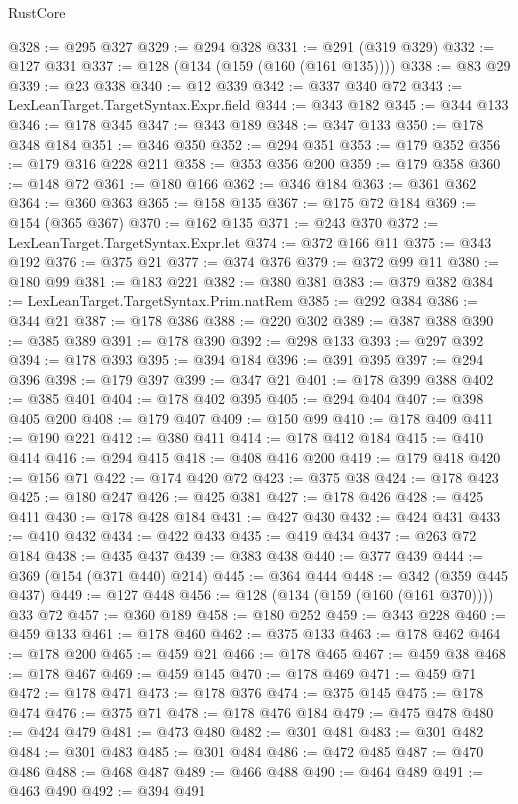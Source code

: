 \begin{lexlean}{RustCore}
\begin{coremodule}
@328 := @295 @327
@329 := @294 @328
@331 := @291 (@319 @329)
@332 := @127 @331
@337 := @128 (@134 (@159 (@160 (@161 @135))))
@338 := @83 @29
@339 := @23 @338
@340 := @12 @339
@342 := @337 @340 @72
@343 := LexLeanTarget.TargetSyntax.Expr.field
@344 := @343 @182
@345 := @344 @133
@346 := @178 @345
@347 := @343 @189
@348 := @347 @133
@350 := @178 @348 @184
@351 := @346 @350
@352 := @294 @351
@353 := @179 @352
@356 := @179 @316 @228 @211
@358 := @353 @356 @200
@359 := @179 @358
@360 := @148 @72
@361 := @180 @166
@362 := @346 @184
@363 := @361 @362
@364 := @360 @363
@365 := @158 @135
@367 := @175 @72 @184
@369 := @154 (@365 @367)
@370 := @162 @135
@371 := @243 @370
@372 := LexLeanTarget.TargetSyntax.Expr.let
@374 := @372 @166 @11
@375 := @343 @192
@376 := @375 @21
@377 := @374 @376
@379 := @372 @99 @11
@380 := @180 @99
@381 := @183 @221
@382 := @380 @381
@383 := @379 @382
@384 := LexLeanTarget.TargetSyntax.Prim.natRem
@385 := @292 @384
@386 := @344 @21
@387 := @178 @386
@388 := @220 @302
@389 := @387 @388
@390 := @385 @389
@391 := @178 @390
@392 := @298 @133
@393 := @297 @392
@394 := @178 @393
@395 := @394 @184
@396 := @391 @395
@397 := @294 @396
@398 := @179 @397
@399 := @347 @21
@401 := @178 @399 @388
@402 := @385 @401
@404 := @178 @402 @395
@405 := @294 @404
@407 := @398 @405 @200
@408 := @179 @407
@409 := @150 @99
@410 := @178 @409
@411 := @190 @221
@412 := @380 @411
@414 := @178 @412 @184
@415 := @410 @414
@416 := @294 @415
@418 := @408 @416 @200
@419 := @179 @418
@420 := @156 @71
@422 := @174 @420 @72
@423 := @375 @38
@424 := @178 @423
@425 := @180 @247
@426 := @425 @381
@427 := @178 @426
@428 := @425 @411
@430 := @178 @428 @184
@431 := @427 @430
@432 := @424 @431
@433 := @410 @432
@434 := @422 @433
@435 := @419 @434
@437 := @263 @72 @184
@438 := @435 @437
@439 := @383 @438
@440 := @377 @439
@444 := @369 (@154 (@371 @440) @214)
@445 := @364 @444
@448 := @342 (@359 @445 @437)
@449 := @127 @448
@456 := @128 (@134 (@159 (@160 (@161 @370)))) @33 @72
@457 := @360 @189
@458 := @180 @252
@459 := @343 @228
@460 := @459 @133
@461 := @178 @460
@462 := @375 @133
@463 := @178 @462
@464 := @178 @200
@465 := @459 @21
@466 := @178 @465
@467 := @459 @38
@468 := @178 @467
@469 := @459 @145
@470 := @178 @469
@471 := @459 @71
@472 := @178 @471
@473 := @178 @376
@474 := @375 @145
@475 := @178 @474
@476 := @375 @71
@478 := @178 @476 @184
@479 := @475 @478
@480 := @424 @479
@481 := @473 @480
@482 := @301 @481
@483 := @301 @482
@484 := @301 @483
@485 := @301 @484
@486 := @472 @485
@487 := @470 @486
@488 := @468 @487
@489 := @466 @488
@490 := @464 @489
@491 := @463 @490
@492 := @394 @491

\end{coremodule}
\end{lexlean}
